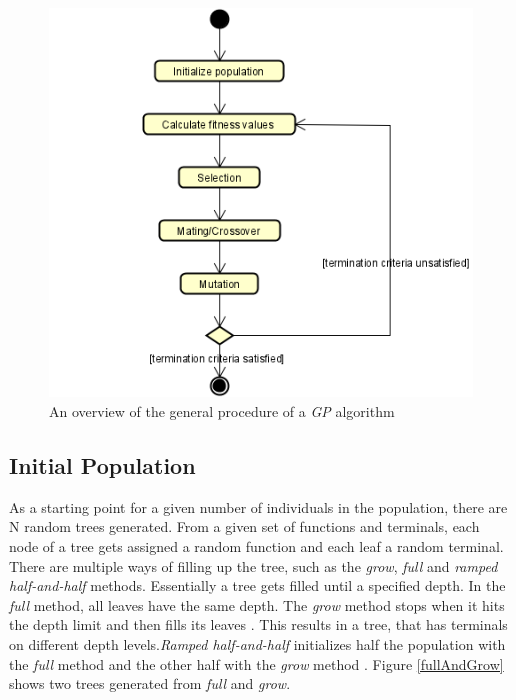\documentclass[tikz, runningheads]{llncs}
\begin{document}
\begin{figure}
	\centering
	\includegraphics[scale=0.7]{Images/OverviewDiagram.PNG}
	\caption{An overview of the general procedure of a \textit{GP} algorithm} \label{OverviewImage}
\end{figure}

\subsection{Initial Population}
As a starting point for a given number of individuals in the population, there are N random trees generated. 
From a given set of functions and terminals, each node of a tree gets assigned a random function and each leaf 
a random terminal. There are multiple ways of filling up the tree, such as the \textit{grow}, \textit{full} and 
\textit{ramped half-and-half} methods. Essentially a tree gets filled until a specified depth. 
In the \textit{full} method, all leaves have the same depth. The \textit{grow} method stops when it hits the depth limit 
and then fills its leaves \cite{FieldGuideToGP}. This results in a tree, that has terminals on different depth levels.\textit{Ramped half-and-half} initializes half the population with the \textit{full} method 
and the other half with the \textit{grow} method \cite{Koza}. Figure \ref{fullAndGrow} shows two trees 
generated from \textit{full} and \textit{grow}.
\end{document}
